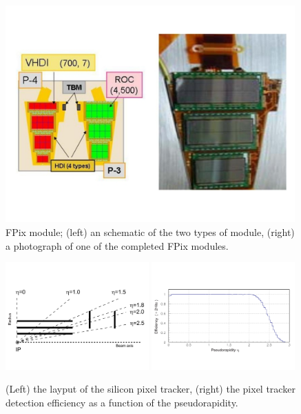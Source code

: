 \begin{figure}
 \centering
\includegraphics[width=0.99\textwidth]{CMS_DetectorFigures/FPixModule.pdf}
 \caption{FPix module; (left) an schematic of the two types of module,
   (right) a photograph of one of the completed FPix modules.\label{fig:Fpix}}
\end{figure}

\begin{figure}
 \centering
\includegraphics[width=0.49\textwidth]{CMS_DetectorFigures/PixelLayout.pdf}
\includegraphics[width=0.49\textwidth]{CMS_DetectorFigures/PixelEfficiency.pdf}
 \caption{(Left) the layput of the silicon pixel tracker, (right) the
   pixel tracker detection efficiency as a function of the pseudorapidity.\label{fig:PixelLayout}}
\end{figure}
